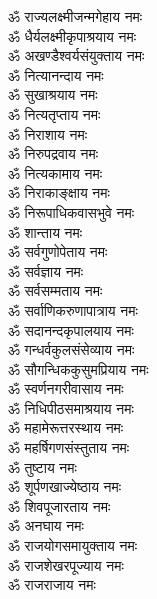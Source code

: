 \begin{multicols}{2}
\begin{flushleft}
ॐ राज्यलक्ष्मीजन्मगेहाय नमः\hfill{}\\ %
ॐ धैर्यलक्ष्मीकृपाश्रयाय नमः\\
ॐ अखण्डैश्वर्यसंयुक्ताय नमः\\
ॐ नित्यानन्दाय नमः\\
ॐ सुखाश्रयाय नमः\\
ॐ नित्यतृप्ताय नमः\\
ॐ निराशाय नमः\\
ॐ निरुपद्रवाय नमः\\
ॐ नित्यकामाय नमः\\
ॐ निराकाङ्क्षाय नमः\\
ॐ निरूपाधिकवासभुवे नमः\hfill{}\\ %
ॐ शान्ताय नमः\\
ॐ सर्वगुणोपेताय नमः\\
ॐ सर्वज्ञाय नमः\\
ॐ सर्वसम्मताय नमः\\
ॐ सर्वाणिकरुणापात्राय नमः\\
ॐ सदानन्दकृपालयाय नमः\\
ॐ गन्धर्वकुलसंसेव्याय नमः\\
ॐ सौगन्धिककुसुमप्रियाय नमः\\
ॐ स्वर्णनगरीवासाय नमः\\
ॐ निधिपीठसमाश्रयाय नमः\hfill{}\\ %
ॐ महामेरूत्तरस्थाय नमः\\
ॐ महर्षिगणसंस्तुताय नमः\\
ॐ तुष्टाय नमः\\
ॐ शूर्पणखाज्येष्ठाय नमः\\
ॐ शिवपूजारताय नमः\\
ॐ अनघाय नमः\\
ॐ राजयोगसमायुक्ताय नमः\\
ॐ राजशेखरपूज्याय नमः\\
ॐ राजराजाय नमः\\ %
\end{flushleft}
\end{multicols}


